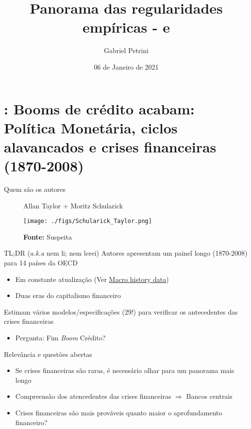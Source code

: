 \documentclass[presentation]{beamer}
\author{Gabriel Petrini}
\date{06 de Janeiro de 2021}
\title{Panorama das regularidades empíricas - \textcite{schularickCreditBoomsGone2012} e  \textcite{sharpe_2020_Why}}
\begin{document}
\maketitle
\section{\textcite{schularickCreditBoomsGone2012}: Booms de crédito acabam: Política Monetária, ciclos alavancados e crises financeiras (1870-2008)}
\label{sec:org4780dc4}

\begin{frame}[label={sec:orgbe70d63}]{Quem são os autores}
\begin{figure}[htb]
\centering
\caption{Allan Taylor + Moritz Schularick} 
\texttt{[image: ./figs/Schularick\_Taylor.png]}
\label{fig:autores01}
\caption*{\textbf{Fonte:} Suspeita}
\end{figure}
\end{frame}

\begin{frame}[label={sec:orgdc204c0}]{TL;DR (\emph{a.k.a} nem li; nem lerei)}
Autores apresentam um painel longo (1870-2008) para 14 países da OECD

\begin{itemize}
\item Em constante atualização (Ver \href{http://www.macrohistory.net/data/}{Macro history data})
\item Duas eras do capitalismo financeiro
\end{itemize}

Estimam vários modelos/especificações (29!) para verificar os antecedentes das crises financeiras
\begin{itemize}
\item \alert{Pergunta:} Fim \emph{Boom} Crédito?
\end{itemize}

\begin{block}{Relevância e questões abertas}
\begin{itemize}
\item Se crises financeiras são raras, é necessário olhar para um panorama mais longo
\item Compreensão dos atencedentes das crises financeiras \(\Rightarrow\) Bancos centrais
\item Crises financeiras são mais prováveis quanto maior o aprofundamento financeiro?
\end{itemize}
\end{block}
\end{frame}
\end{document}
